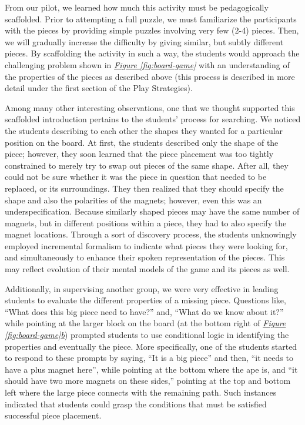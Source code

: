 \documentclass{acm_proc_article-sp}
\begin{document}
From our pilot, we learned how much this activity must be pedagogically scaffolded. 
Prior to attempting a full puzzle, we must familiarize the participants with the pieces by providing simple puzzles involving very few (2-4) pieces. 
Then, we will gradually increase the difficulty by giving similar, but subtly different pieces. 
By scaffolding the activity in such a way, the students would approach the challenging problem shown in {\em \hyperref[fig:board-game]{Figure \ref{fig:board-game}}} with an understanding of the properties of the pieces as described above (this process is described in more detail under the first section of the Play Strategies).

Among many other interesting observations, one that we thought supported this scaffolded introduction pertains to the students' process for searching. 
We noticed the students describing to each other the shapes they wanted for a particular position on the board. 
At first, the students described only the shape of the piece; however, they soon learned that the piece placement was too tightly constrained to merely try to swap out pieces of the same shape. 
After all, they could not be sure whether it was the piece in question that needed to be replaced, or its surroundings. 
They then realized that they should specify the shape and also the polarities of the magnets; however, even this was an underspecification. 
Because similarly shaped pieces may have the same number of magnets, but in different positions within a piece, they had to also specify the magnet locations. 
Through a sort of discovery process, the students unknowingly employed incremental formalism\cite{shipman1999formality} to indicate what pieces they were looking for, and simultaneously to enhance their spoken representation of the pieces. 
This may reflect evolution of their mental models of the game and its pieces as well.

Additionally, in supervising another group, we were very effective in leading students to evaluate the different properties of a missing piece. 
Questions like, ``What does this big piece need to have?'' and, ``What do we know about it?'' while pointing at the larger block on the board (at the bottom right of {\em \hyperref[fig:board-game]{Figure \ref{fig:board-game}b}}) prompted students to use conditional logic in identifying the properties and eventually the piece. 
More specifically, one of the students started to respond to these prompts by saying, ``It is a big piece'' and then, ``it needs to have a plus magnet here'', while pointing at the bottom where the ape is, and ``it should have two more magnets on these sides,'' pointing at the top and bottom left where the large piece connects with the remaining path. 
Such instances indicated that students could grasp the conditions that must be satisfied successful piece placement.
\end{document}
